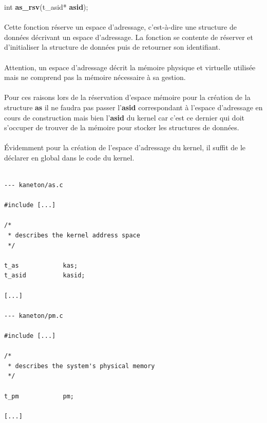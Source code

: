 \documentclass[10pt,a4wide]{article}
\begin{document}
\hspace{1.5cm}int \textbf{as\_rsv}(t\_asid* \textbf{asid});

\paragraph{}

Cette fonction r\'eserve un espace d'adressage, c'est-\`a-dire une structure
de donn\'ees d\'ecrivant un espace d'adressage. La fonction se contente
de r\'eserver et d'initialiser la structure de donn\'ees puis de retourner
son identifiant.

\paragraph{}

Attention, un espace d'adressage d\'ecrit la m\'emoire physique et
virtuelle utilis\'ee mais ne comprend pas la m\'emoire n\'ecessaire
\`a sa gestion.

\paragraph{}

Pour ces raisons lors de la r\'eservation d'espace m\'emoire pour la
cr\'eation de la structure \textbf{as} il ne faudra pas passer l'\textbf{asid}
correspondant \`a l'espace d'adressage en cours de construction mais
bien l'\textbf{asid} du kernel car c'est ce dernier qui doit s'occuper
de trouver de la m\'emoire pour stocker les structures de donn\'ees.

\paragraph{}

\'Evidemment pour la cr\'eation de l'espace d'adressage du kernel, il suffit
de le d\'eclarer en global dans le code du kernel.

\begin{verbatim}

--- kaneton/as.c

#include [...]

/*
 * describes the kernel address space
 */

t_as            kas;
t_asid          kasid;

[...]

--- kaneton/pm.c

#include [...]

/*
 * describes the system's physical memory
 */

t_pm            pm;

[...]

\end{verbatim}
\end{document}
